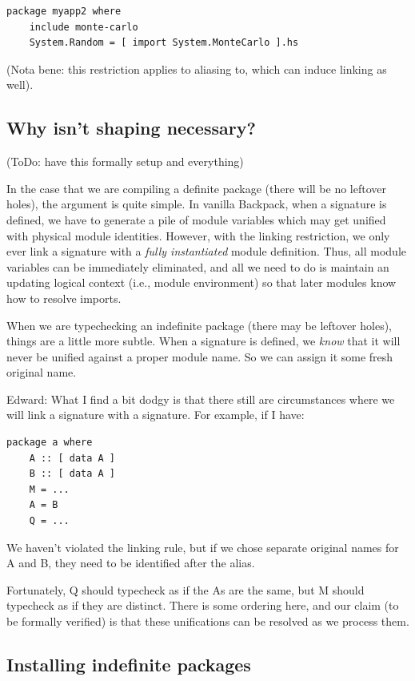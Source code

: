\documentclass{article}
\begin{document}
\begin{verbatim}
package myapp2 where
    include monte-carlo
    System.Random = [ import System.MonteCarlo ].hs
\end{verbatim}

(Nota bene: this restriction applies to aliasing to, which can induce
linking as well).

\subsection{Why isn't shaping necessary?}

(ToDo: have this formally setup and everything)

In the case that we are compiling a definite package (there will be no leftover
holes), the argument is quite simple.  In vanilla Backpack, when a
signature is defined, we have to generate a pile of module variables
which may get unified with physical module identities.  However, with
the linking restriction, we only ever link a signature with a
\emph{fully instantiated} module definition. Thus, all module variables
can be immediately eliminated, and all we need to do is maintain an
updating logical context (i.e., module environment) so that later
modules know how to resolve imports.

When we are typechecking an indefinite package (there may be leftover
holes), things are a little more subtle.  When a signature is defined,
we \emph{know} that it will never be unified against a proper module
name.  So we can assign it some fresh original name.

Edward: What I find a bit dodgy is that there still are circumstances
where we will link a signature with a signature.  For example, if I have:

\begin{verbatim}
package a where
    A :: [ data A ]
    B :: [ data A ]
    M = ...
    A = B
    Q = ...
\end{verbatim}

We haven't violated the linking rule, but if we chose separate original
names for A and B, they need to be identified after the alias.

Fortunately, Q should typecheck as if the As are the same, but M should
typecheck as if they are distinct.  There is some ordering here, and our
claim (to be formally verified) is that these unifications can be
resolved as we process them.

\subsection{Installing indefinite packages}\label{sec:indefinite-packages}
\end{document}
